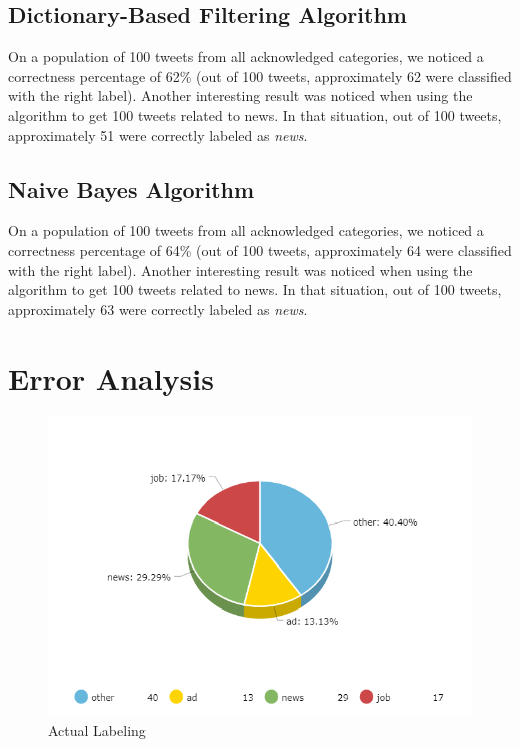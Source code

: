 \documentclass{article}
\begin{document}
\subsection{Dictionary-Based Filtering Algorithm}
\large
{
\quad
On a population of 100 tweets from all acknowledged categories, we noticed a correctness percentage of 62\% (out of 100 tweets, approximately 62 were classified with the right label). Another interesting result was noticed when using the algorithm to get 100 tweets related to news. In that situation, out of 100 tweets, approximately 51 were correctly labeled as \textit{news}.
}

\subsection{Naive Bayes Algorithm}
\large
{
\quad
On a population of 100 tweets from all acknowledged categories, we noticed a correctness percentage of 64\% (out of 100 tweets, approximately 64 were classified with the right label). Another interesting result was noticed when using the algorithm to get 100 tweets related to news. In that situation, out of 100 tweets, approximately 63 were correctly labeled as \textit{news}.
}

\clearpage
\vspace*{\fill}
\section{Error Analysis}

\begin{figure}[H]
    \centering
    \includegraphics[width=\linewidth]{figures/Actual_Labeling}
    \caption{Actual Labeling}
\end{figure}
\vfill 
\clearpage
\end{document}
